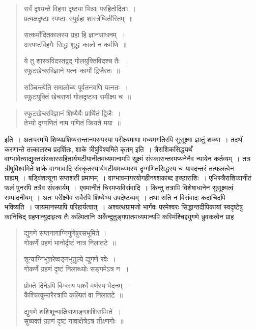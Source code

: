 \documentclass[11pt, openany]{book}
\begin{document}
\begin{quote}
{\qt सर्वं दृश्यन्ते विहगा दृष्ट्या भिन्नाः परहितोदिताः~।\\
प्रत्यक्षदृष्टाः स्पष्टाः स्युर्ग्रहा शास्त्रेष्वितीरितम्~॥

सत्कर्मोदितकालस्य ग्रहा हि ज्ञानसाधनम्~।\\
अस्पष्टविहगैः सिद्धः शुद्धः कालो न कर्मणि~॥

ये तु शास्त्रविदस्तद्वद् गोलयुक्तिविदश्च तैः~।\\
स्फुटखेचरविज्ञाने यत्नः कार्यो द्विजैरतः~॥

सञ्चिन्त्येति समालोच्य पूर्वतन्त्राणि यत्नतः~।\\
स्फुटयुक्तिं खेचराणां गोलदृष्ट्या समीक्ष्य च~॥}
\end{quote}

\newpage

\begin{quote}
{\qt स्फुटखेचरविज्ञानं शिष्यैर्यैः प्रार्थितं द्विजैः~।\\
तेभ्यो दृग्गणितं नाम गणितं क्रियते मया~॥}
\end{quote}

\noindent इति~। अतःपरमपि शिष्यप्रशिष्यसन्तानपरम्परया परीक्ष्यमाणा मध्यमगतिरपि सुसूक्ष्मा ज्ञातुं शक्या~। तदर्थं करणान्ते तत्कालश्च
प्रदर्शितः, {\qt शाके त्रीषुविश्वमिते कृतम्} इति~। त्रैराशिकसिद्ध्यर्थं वाग्भावेत्याद्युक्तसंस्कारसहितार्यभटीयानीतमध्यमानामपि सूक्ष्मं
संस्कारान्तरमप्यनेनैव न्यायेन कर्तव्यम्~। तत्र {\qt त्रीषुविश्वमिते शाके} वाग्भावादि संस्कृतस्यार्यभटीयमध्यमस्य दृग्गणितसिद्धस्य च यावदन्तरं
तत्फलत्वेन ग्राह्यम्~। षड्विंशत्यूना सप्तशती प्रमाणम्~। वाग्भावमागरयोगहीनश्शकाब्द इच्छाराशिः~। एभिस्त्रैराशिकानीतं फलं पुनरपि तत्रैव
संस्कार्यम्~। एवमानीतं चिरमप्यविसंवादि~। किन्तु तत्रापि विशेषाधानेन सुसूक्ष्मत्वं सम्पादनीयम्~। अतः परीक्ष्यैव सर्वैरपि शिष्येभ्य
उपदेष्टव्यम्~। तथा सति न विसंवादः कदाचिदपि भविष्यति~। जायमानस्यापि परिहार्यत्वात्~। अश्वत्थग्रामजो भार्गवः परमेश्वरः
सिद्धान्तदीपिकायां स्वदृष्टेषु कानिचिद् ग्रहणान्युदाहृत्य तैः कल्पितानि अर्केन्दुतुङ्गपातमध्यमान्यपि कस्मिंश्चिद्द्युगणे ध्रुवकत्वेन प्राह\textendash 

\begin{quote}
{\qt द्युगणे सप्तनागाग्निगुणेषुरसभूमिते~।\\
गोकर्णे ग्रहणं भानोर्दृष्टं नात्र निलातटे~॥

शून्याग्निभूशरेष्वङ्गभूतुल्ये द्युगणे रवेः~।\\
गोकर्णे ग्रहणं दृष्टं निलाब्ध्योः सङ्गमेऽत्र न~॥

प्रोक्ते दिनेऽपि बिम्बस्य पार्श्वे वर्णस्य भेदनम्~।\\
कैश्चित्कुमारैरत्रापि कल्पितं वा निलातटे~॥

द्युगणे शशिशून्याक्षिबाणाङ्गशशिसम्मिते~।\\
सुव्यक्तं ग्रहणं दृष्टं नावाक्षेत्रेऽत्र तीक्ष्णगोः~॥}
\end{quote}
\end{document}
